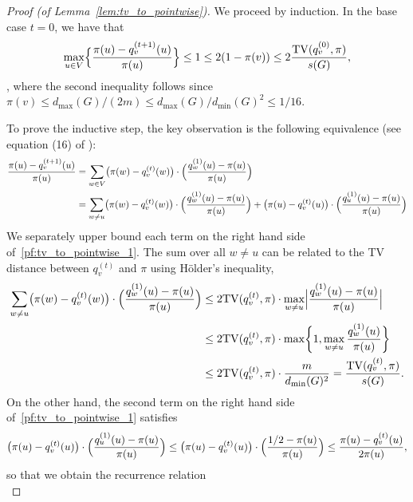 \documentclass{article}
\newcommand{\1}{\mathbf{1}}
\theoremstyle{definition}
\theoremstyle{remark}
\begin{document}
\begin{proof}[Proof (of Lemma~\ref{lem:tv_to_pointwise})]
	We proceed by induction. In the base case $t = 0$, we have that
	\begin{equation*}
	\max_{u \in V} \Bigl\{\frac{\pi(u) - q_v^{(t + 1)}(u)}{\pi(u)}\Bigr\} \leq 1 \leq 2(1 - \pi(v)) \leq 2\frac{\mathrm{TV}(q_v^{(0)},\pi)}{s(G)},
	\end{equation*},
	where the second inequality follows since $\pi(v) \leq d_{\max}(G)/(2m) \leq d_{\max}(G)/d_{\min}(G)^2 \leq 1/16$. 
	
	To prove the inductive step, the key observation is the following equivalence (see equation (16) of \citep{morris2005}):
	\begin{align}
	\label{pf:tv_to_pointwise_1}
	\frac{\pi(u) - q_v^{(t + 1)}(u)}{\pi(u)} & = \sum_{w \in V} \bigl(\pi(w) - q_v^{(t)}(w) \bigr) \cdot \Bigl(\frac{q_w^{(1)}(u) - \pi(u)}{\pi(u)}\Bigr) \nonumber \\
	& = \sum_{w \neq u} \bigl(\pi(w) - q_v^{(t)}(w) \bigr) \cdot \Bigl(\frac{q_w^{(1)}(u) - \pi(u)}{\pi(u)}\Bigr) + \bigl(\pi(u) - q_v^{(t)}(u) \bigr) \cdot \Bigl(\frac{q_u^{(1)}(u) - \pi(u)}{\pi(u)}\Bigr)
	\end{align}
	We separately upper bound each term on the right hand side of~\eqref{pf:tv_to_pointwise_1}. The sum over all $w \neq u$ can be related to the TV distance between $q_v^{(t)}$ and $\pi$ using H{\"o}lder's inequality,
	\begin{align*}
	\sum_{w \neq u} \bigl(\pi(w) - q_v^{(t)}(w) \bigr) \cdot \Bigl(\frac{q_w^{(1)}(u) - \pi(u)}{\pi(u)}\Bigr) & \leq 2\mathrm{TV}(q_v^{(t)},\pi) \cdot \max_{w \neq u}\Bigl|\frac{q_w^{(1)}(u) - \pi(u)}{\pi(u)}\Bigr| \\
	& \leq 2\mathrm{TV}(q_v^{(t)},\pi) \cdot \max\biggl\{1, \max_{w \neq u} \frac{q_w^{(1)}(u)}{\pi(u)} \biggr\} \\
	& \leq 2\mathrm{TV}(q_v^{(t)},\pi) \cdot \frac{m}{d_{\min}(G)^2} = \frac{\mathrm{TV}(q_v^{(t)},\pi) }{s(G)}.
	\end{align*}
	On the other hand, the second term on the right hand side of~\eqref{pf:tv_to_pointwise_1} satisfies
	\begin{align*}
	\bigl(\pi(u) - q_v^{(t)}(u) \bigr) \cdot \Bigl(\frac{q_u^{(1)}(u) - \pi(u)}{\pi(u)}\Bigr) \leq \bigl(\pi(u) - q_v^{(t)}(u) \bigr) \cdot \Bigl(\frac{1/2 - \pi(u)}{\pi(u)}\Bigr) \leq \frac{\pi(u) - q_v^{(t)}(u)}{2\pi(u)},
	\end{align*}
	so that we obtain the recurrence relation
	\begin{equation*}

\end{equation*}
\end{proof}
\end{document}
